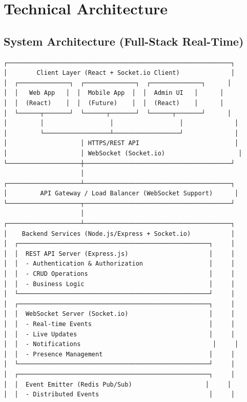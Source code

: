 \documentclass[11pt,a4paper]{article}
\begin{document}
\section{Technical Architecture}

\subsection{System Architecture (Full-Stack Real-Time)}
\begin{codebox}
\begin{verbatim}
┌─────────────────────────────────────────────────────────────┐
│        Client Layer (React + Socket.io Client)              │
│  ┌──────────────┐  ┌──────────────┐  ┌──────────────┐      │
│  │   Web App   │  │  Mobile App  │  │  Admin UI   │      │
│  │  (React)    │  │  (Future)    │  │  (React)    │      │
│  └──────┬───────┘  └──────┬───────┘  └──────┬───────┘      │
│         │                  │                  │              │
│         └──────────────────┴──────────────────┘              │
│                    │ HTTPS/REST API                          │
│                    │ WebSocket (Socket.io)                    │
└────────────────────┼────────────────────────────────────────┘
                     │
┌────────────────────┴────────────────────────────────────────┐
│         API Gateway / Load Balancer (WebSocket Support)      │
└────────────────────┬────────────────────────────────────────┘
                     │
┌────────────────────┴────────────────────────────────────────┐
│    Backend Services (Node.js/Express + Socket.io)           │
│  ┌────────────────────────────────────────────────────┐     │
│  │  REST API Server (Express.js)                      │     │
│  │  - Authentication & Authorization                  │     │
│  │  - CRUD Operations                                 │     │
│  │  - Business Logic                                  │     │
│  └────────────────────────────────────────────────────┘     │
│  ┌────────────────────────────────────────────────────┐     │
│  │  WebSocket Server (Socket.io)                      │     │
│  │  - Real-time Events                                │     │
│  │  - Live Updates                                    │     │
│  │  - Notifications                                    │     │
│  │  - Presence Management                             │     │
│  └────────────────────────────────────────────────────┘     │
│  ┌────────────────────────────────────────────────────┐     │
│  │  Event Emitter (Redis Pub/Sub)                    │     │
│  │  - Distributed Events                              │     │

\end{verbatim}
\end{codebox}
\end{document}
